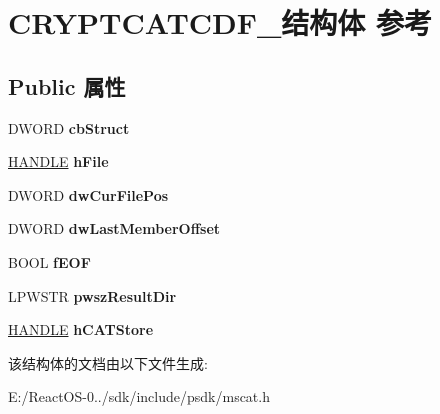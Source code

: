 \hypertarget{struct_c_r_y_p_t_c_a_t_c_d_f__}{}\section{C\+R\+Y\+P\+T\+C\+A\+T\+C\+D\+F\+\_\+结构体 参考}
\label{struct_c_r_y_p_t_c_a_t_c_d_f__}
\subsection*{Public 属性}
\begin{DoxyCompactItemize}
\item 
\mbox{\label{struct_c_r_y_p_t_c_a_t_c_d_f___ae9384327ad2c60d5b99956b9971344f7}} 
D\+W\+O\+RD {\bfseries cb\+Struct}
\item 
\mbox{\label{struct_c_r_y_p_t_c_a_t_c_d_f___abe29c214e4d8def974cf6a5214176319}} 
\hyperlink{interfacevoid}{H\+A\+N\+D\+LE} {\bfseries h\+File}
\item 
\mbox{\label{struct_c_r_y_p_t_c_a_t_c_d_f___aa922a46350f397d4dbc24977ad59b859}} 
D\+W\+O\+RD {\bfseries dw\+Cur\+File\+Pos}
\item 
\mbox{\label{struct_c_r_y_p_t_c_a_t_c_d_f___ac487a0d32abe3685d915a666d8ca489f}} 
D\+W\+O\+RD {\bfseries dw\+Last\+Member\+Offset}
\item 
\mbox{\label{struct_c_r_y_p_t_c_a_t_c_d_f___a81e03565b4e581b44ba0dd298f1b1518}} 
B\+O\+OL {\bfseries f\+E\+OF}
\item 
\mbox{\label{struct_c_r_y_p_t_c_a_t_c_d_f___acb7ba921427453b2956f125cadb3aa62}} 
L\+P\+W\+S\+TR {\bfseries pwsz\+Result\+Dir}
\item 
\mbox{\label{struct_c_r_y_p_t_c_a_t_c_d_f___ab2d09a0269ddc4f92c431b06be3fe2eb}} 
\hyperlink{interfacevoid}{H\+A\+N\+D\+LE} {\bfseries h\+C\+A\+T\+Store}
\end{DoxyCompactItemize}


该结构体的文档由以下文件生成\+:\begin{DoxyCompactItemize}
\item 
E\+:/\+React\+O\+S-\/0../sdk/include/psdk/mscat.\+h\end{DoxyCompactItemize}
